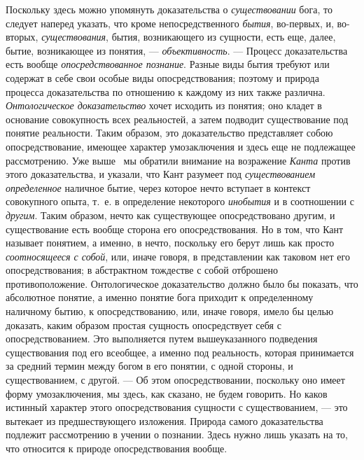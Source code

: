 Поскольку здесь можно упомянуть доказательства о
{\em существовании} бога, то следует наперед указать,
что кроме непосредственного {\em бытия}, во-первых, и,
во-вторых, {\em существования}, бытия, возникающего из
сущности, есть еще, далее, бытие, возникающее из понятия, —
{\em объективность}. — Процесс доказательства есть
вообще {\em опосредствованное познание}. Разные виды
бытия требуют или содержат в себе свои особые виды опосредствования;
поэтому и природа процесса доказательства по отношению к каждому из них
также различна. {\em Онтологическое доказательство}
хочет исходить из понятия; оно кладет в основание совокупность всех
реальностей, а затем подводит существование под понятие реальности. Таким
образом, это доказательство представляет собою опосредствование, имеющее
характер умозаключения и здесь еще не подлежащее рассмотрению. Уже
выше~\label{bkm:Ref474666940}
мы обратили внимание на возражение {\em Канта} против
этого доказательства, и указали, что Кант разумеет под
{\em существованием определенное} наличное бытие, через
которое нечто вступает в контекст совокупного опыта, т.~е. в определение
некоторого {\em инобытия} и в соотношении с
{\em другим}. Таким образом, нечто как существующее
опосредствовано другим, и существование есть вообще сторона его
опосредствования. Но в том, что Кант называет понятием, а именно, в нечто,
поскольку его берут лишь как просто {\em соотносящееся
с собой}, или, иначе говоря, в представлении как таковом нет его
опосредствования; в абстрактном тождестве с собой отброшено
противоположение. Онтологическое доказательство должно было бы показать,
что абсолютное понятие, а именно понятие бога приходит к определенному
наличному бытию, к опосредствованию, или, иначе говоря, имело бы целью
доказать, каким образом простая сущность опосредствует себя с
опосредствованием. Это выполняется путем вышеуказанного подведения
существования под его всеобщее, а именно под реальность, которая
принимается за средний термин между богом в его понятии, с одной стороны, и
существованием, с другой. — Об этом опосредствовании, поскольку оно имеет
форму умозаключения, мы здесь, как сказано, не будем говорить. Но каков
истинный характер этого опосредствования сущности с существованием, — это
вытекает из предшествующего изложения. Природа самого доказательства
подлежит рассмотрению в учении о познании. Здесь нужно лишь указать на то,
что относится к природе опосредствования вообще.

